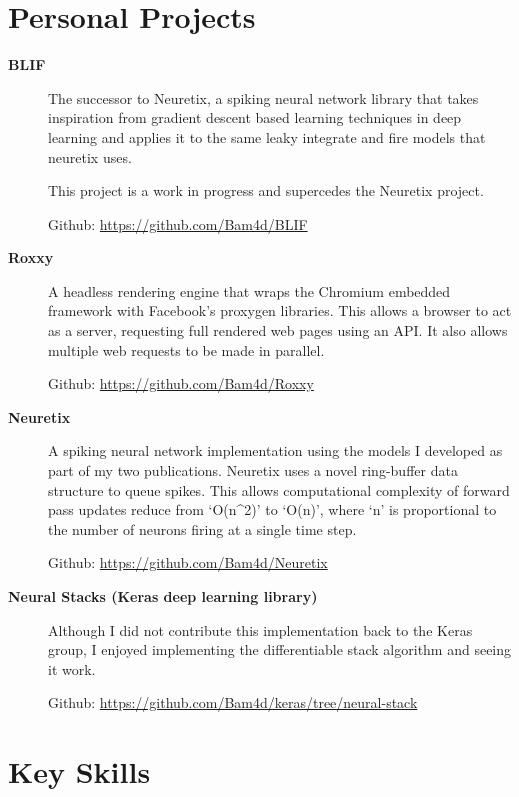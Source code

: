 \documentclass[a4paper]{article}
\def\tightlist{}
\begin{document}
\section{Personal Projects}\label{personal-projects}

\begin{description}
\tightlist
\item[\textbf{BLIF}]
The successor to Neuretix, a spiking neural network library that takes
inspiration from gradient descent based learning techniques in deep
learning and applies it to the same leaky integrate and fire models that
neuretix uses.

This project is a work in progress and supercedes the Neuretix project.

Github: \url{https://github.com/Bam4d/BLIF}
\item[\textbf{Roxxy}]
A headless rendering engine that wraps the Chromium embedded framework
with Facebook's proxygen libraries. This allows a browser to act as a
server, requesting full rendered web pages using an API. It also allows
multiple web requests to be made in parallel.

Github: \url{https://github.com/Bam4d/Roxxy}
\item[\textbf{Neuretix}]
A spiking neural network implementation using the models I developed as
part of my two publications. Neuretix uses a novel ring-buffer data
structure to queue spikes. This allows computational complexity of
forward pass updates reduce from `O(n\^{}2)' to `O(n)', where `n' is
proportional to the number of neurons firing at a single time step.

Github: \url{https://github.com/Bam4d/Neuretix}
\item[\textbf{Neural Stacks (Keras deep learning library)}]
Although I did not contribute this implementation back to the Keras
group, I enjoyed implementing the differentiable stack algorithm and
seeing it work.

Github: \url{https://github.com/Bam4d/keras/tree/neural-stack}
\end{description}

\section{Key Skills}\label{key-skills}
\end{document}
